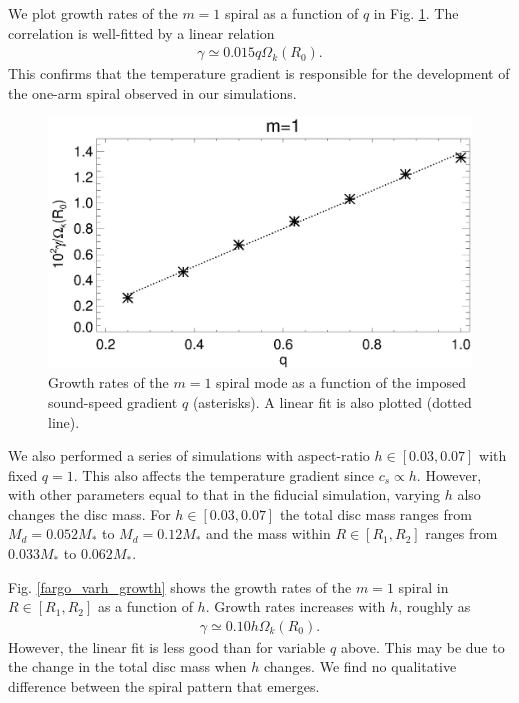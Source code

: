 We plot growth rates of the $m=1$ spiral as a function of $q$ in 
Fig. \ref{fargo_varq_growth}. The correlation is well-fitted by a
linear relation
\begin{align*}
  \gamma \simeq 0.015 q \Omega_k(R_0). 
\end{align*}
This confirms that the temperature gradient is responsible for the
development of the one-arm spiral observed in our simulations. 
\begin{figure}
  \includegraphics[width=\linewidth]{figures/m1_analysis_plot_ratemax_fargo_varq.ps}    
  \caption{Growth rates of the $m=1$ spiral mode as a function of the
    imposed sound-speed gradient $q$ (asterisks). A linear fit is also
    plotted (dotted line). 
    \label{fargo_varq_growth}} 
\end{figure}


We also performed a series of simulations with aspect-ratio
$h\in[0.03,0.07]$ with fixed $q=1$. This also affects the temperature
gradient since $c_s \propto h$. However, with other parameters equal
to that in the fiducial simulation,  varying $h$ also changes the disc
mass. For $h\in[0.03,0.07]$ the total disc mass ranges from
$M_d=0.052M_*$ to $M_d=0.12M_*$ and the 
mass within $R\in[R_1,R_2]$  ranges from $0.033M_*$ to $0.062M_*$. 

Fig. \ref{fargo_varh_growth} shows the growth rates of the $m=1$
spiral in $R\in[R_1,R_2]$ as a function of $h$. Growth rates increases
with $h$, roughly as 
\begin{align}
  \gamma \simeq 0.10h\Omega_k(R_0).  
\end{align}
However, the linear fit is less good than for variable $q$ above. This
may be due to the change in the total disc mass when $h$ changes. We
find no qualitative difference between the spiral pattern that
emerges. 

